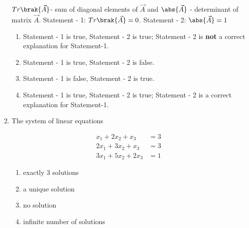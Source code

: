 \begin{enumerate}[label=\thesubsection.\arabic*.,ref=\thesubsection.\theenumi]
	\newline
	$Tr\brak{\vec{A}}$- sum of diagonal elements of $\vec{A}$ and
	\newline
	$\abs{\vec{A}}$ - determinant of matrix $\vec{A}$.
	\newline
	{Statement - 1:} $Tr\brak{\vec{A}} = 0$.
	\newline
	{Statement - 2:} $\abs{\vec{A}} = 1$
	\hfill{}
	\begin{enumerate}
		\item Statement - 1 is true, Statement - 2 is true; Statement - 2 is \textbf{not} a correct explanation for Statement-1. 
	    	\item Statement - 1 is true, Statement - 2 is false. 
	    	\item Statement - 1 is false, Statement - 2 is true.
	    	\item Statement - 1 is true, Statement - 2 is true; Statement - 2 is a correct explanation for Statement-1. 
	\end{enumerate}
%
    \item The system of linear equations
	\hfill{}{\par}
	\begin{align*}
		x_1 + 2x_2 + x_3 &= 3\\
		2x_1 + 3x_2 + x_3 &= 3\\
		3x_1 + 5x_2 + 2x_3 &= 1
	\end{align*}
\begin{multicols}{2}
	\begin{enumerate}
		\item exactly $3$ solutions
	    	\item a unique solution
	    	\item no solution
	    	\item infinite number of solutions
	\end{enumerate}
\end{multicols}


\end{enumerate}
